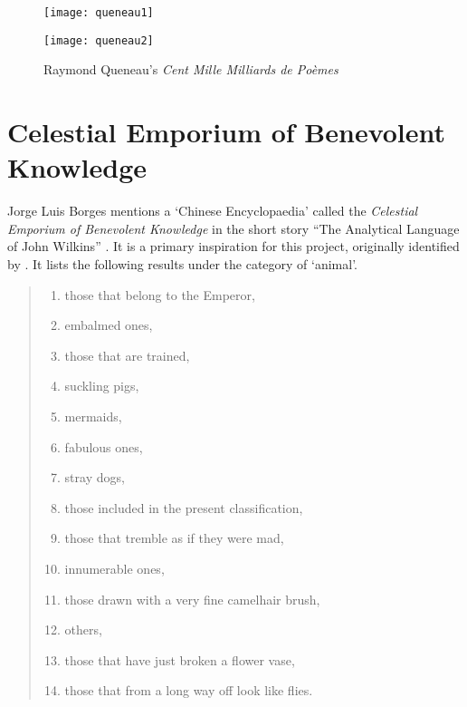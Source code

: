 \begin{figure}[!htbp]
\centering
\begin{minipage}{.45\linewidth}
  \texttt{[image: queneau1]}
\end{minipage}
\hspace{.05\linewidth}
\begin{minipage}{.45\linewidth}
  \texttt{[image: queneau2]}
\end{minipage}
\caption[Queneau's \textit{Cent Mille Milliards de Poèmes}]{Raymond Queneau's \textit{Cent Mille Milliards de Poèmes}\footnotemark}
\label{fig:queneau12}
\end{figure}


\section{Celestial Emporium of Benevolent Knowledge}
\label{s:borges}

Jorge Luis Borges mentions a `Chinese Encyclopaedia' called the \emph{Celestial Emporium of Benevolent Knowledge} in the short story ``The Analytical Language of John Wilkins'' \citeyear{Borges2000}. It is a primary inspiration for this project, originally identified by \autocite{Hendler2011, Hendler2013}. It lists the following results under the category of `animal'.

\begin{quotation}
\begin{enumerate}
  \item those that belong to the Emperor,
  \item embalmed ones,
  \item those that are trained,
  \item suckling pigs,
  \item mermaids,
  \item fabulous ones,
  \item stray dogs,
  \item those included in the present classification,
  \item those that tremble as if they were mad,
  \item innumerable ones,
  \item those drawn with a very fine camelhair brush,
  \item others,
  \item those that have just broken a flower vase,
  \item those that from a long way off look like flies.
\end{enumerate}
\end{quotation}

